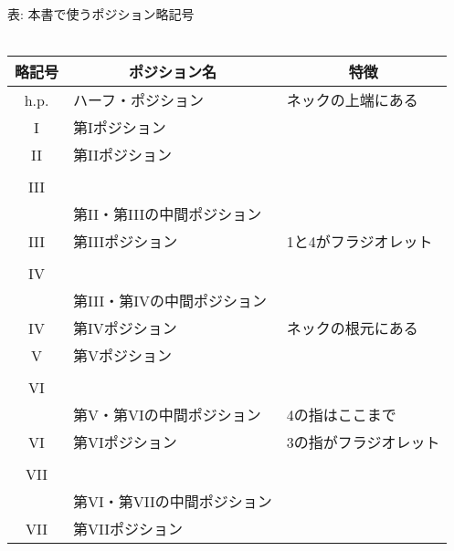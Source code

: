 \begin{flushleft}
\begin{minipage}{280pt}
\begin{small}
\begin{center}
表: 本書で使うポジション略記号\\ \ \\
\begin{tabular}{c|ll}
略記号 & \multicolumn{1}{c}{ポジション名} \cite{simandl} & \multicolumn{1}{c}{特徴}\\
\hline
h.p.   & ハーフ・ポジション       & ネックの上端にある\\
I      & 第Iポジション            & \\
II     & 第IIポジション            & \\
\(\roffset{0.6}{\small [}
\begin{tiny}
\begin{array}{c}
{\rm II}\\
{\rm III}\\
\end{array}
\end{tiny}
\)
 & 第II・第IIIの中間ポジション &\\
III    & 第IIIポジション      & 1と4がフラジオレット\\
\(\roffset{0.6}{\small [}
\begin{tiny}
\begin{array}{c}
{\rm III}\\
{\rm IV}\\
\end{array}
\end{tiny}
\)
& 第III・第IVの中間ポジション & \\
IV     & 第IVポジション            & ネックの根元にある\\
V      & 第Vポジション            & \\
\(\roffset{0.6}{\small [}
\begin{tiny}
\begin{array}{c}
{\rm V}\\
{\rm VI}\\
\end{array}
\end{tiny}
\)
& 第V・第VIの中間ポジション & 4の指はここまで\\
VI     & 第VIポジション            & 3の指がフラジオレット\\
\(\roffset{0.6}{\small [}
\begin{tiny}
\begin{array}{c}
{\rm VI}\\
{\rm VII}\\
\end{array}
\end{tiny}
\)
 & 第VI・第VIIの中間ポジション & \\
VII    & 第VIIポジション            & \\
\end{tabular}
\end{center}
\end{small}


\end{minipage}
\end{flushleft}
